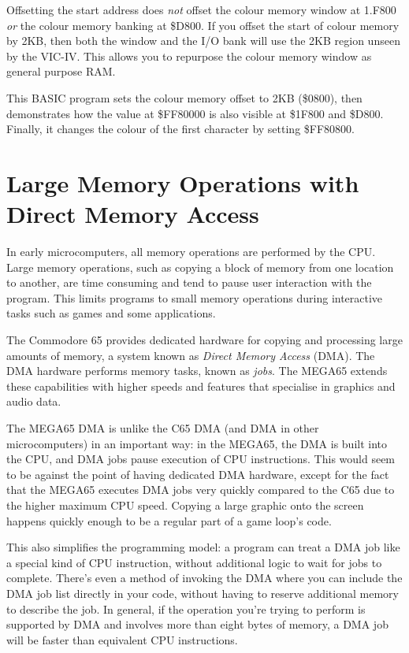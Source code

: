Offsetting the start address does {\em not} offset the colour memory window at 1.F800 {\em or} the colour memory banking at \$D800. If you offset the start of colour memory by 2KB, then both the window and the I/O bank will use the 2KB region unseen by the VIC-IV. This allows you to repurpose the colour memory window as general purpose RAM.

This BASIC program sets the colour memory offset to 2KB (\$0800), then demonstrates how the value at \$FF80000 is also visible at \$1F800 and \$D800. Finally, it changes the colour of the first character by setting \$FF80800.



\newpage
\section{Large Memory Operations with Direct Memory Access}

In early microcomputers, all memory operations are performed by the CPU. Large memory operations, such as copying a block of memory from one location to another, are time consuming and tend to pause user interaction with the program. This limits programs to small memory operations during interactive tasks such as games and some applications.

The Commodore 65 provides dedicated hardware for copying and processing large amounts of memory, a system known as {\em Direct Memory Access} (DMA). The DMA hardware performs memory tasks, known as {\em jobs}. The MEGA65 extends these capabilities with higher speeds and features that specialise in graphics and audio data.

The MEGA65 DMA is unlike the C65 DMA (and DMA in other microcomputers) in an important way: in the MEGA65, the DMA is built into the CPU, and DMA jobs pause execution of CPU instructions. This would seem to be against the point of having dedicated DMA hardware, except for the fact that the MEGA65 executes DMA jobs very quickly compared to the C65 due to the higher maximum CPU speed. Copying a large graphic onto the screen happens quickly enough to be a regular part of a game loop's code.

This also simplifies the programming model: a program can treat a DMA job like a special kind of CPU instruction, without additional logic to wait for jobs to complete. There's even a method of invoking the DMA where you can include the DMA job list directly in your code, without having to reserve additional memory to describe the job. In general, if the operation you're trying to perform is supported by DMA and involves more than eight bytes of memory, a DMA job will be faster than equivalent CPU instructions.


